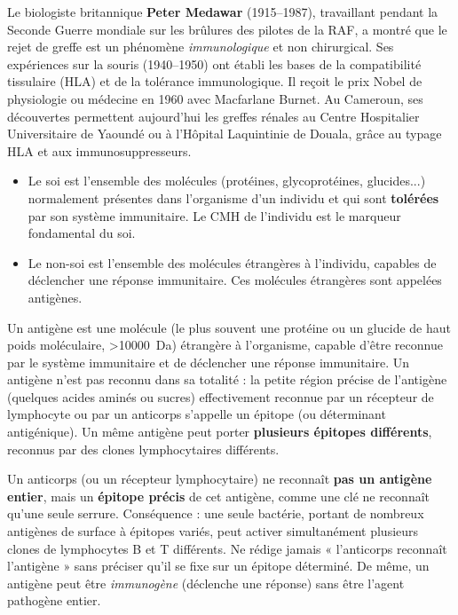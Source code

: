 \documentclass[11pt]{article}
\newcommand{\cle}[1]{{\popxbold\color{popdark}#1}}
\newcounter{popsec}
\newcounter{popsub}
\newcommand{\courssub}[1]{%
  \stepcounter{popsub}%
  \par\vspace{9pt}\noindent{\popxbold\fontsize{11.5}{13}\selectfont\color{popink}{\color{poporange}\thepopsec.\thepopsub}\hspace{6pt}#1}\par\nopagebreak\vspace{4pt}
}
\begin{document}
\begin{savaistu}
Le biologiste britannique \textbf{Peter Medawar} (1915--1987), travaillant pendant la Seconde Guerre mondiale sur les brûlures des pilotes de la RAF, a montré que le rejet de greffe est un phénomène \emph{immunologique} et non chirurgical. Ses expériences sur la souris (1940--1950) ont établi les bases de la compatibilité tissulaire (HLA) et de la tolérance immunologique. Il reçoit le prix Nobel de physiologie ou médecine en 1960 avec Macfarlane Burnet. Au Cameroun, ses découvertes permettent aujourd'hui les greffes rénales au Centre Hospitalier Universitaire de Yaoundé ou à l'Hôpital Laquintinie de Douala, grâce au typage HLA et aux immunosuppresseurs.
\end{savaistu}

\courssub{Le soi et le non-soi : définitions}

\begin{definition}
\begin{itemize}
\item Le \cle{soi} est l'ensemble des molécules (protéines, glycoprotéines, glucides...) normalement présentes dans l'organisme d'un individu et qui sont \textbf{tolérées} par son système immunitaire. Le CMH de l'individu est le marqueur fondamental du soi.
\item Le \cle{non-soi} est l'ensemble des molécules étrangères à l'individu, capables de déclencher une réponse immunitaire. Ces molécules étrangères sont appelées \cle{antigènes}.
\end{itemize}
\end{definition}

\begin{definition}
Un \cle{antigène} est une molécule (le plus souvent une protéine ou un glucide de haut poids moléculaire, \textgreater \SI{10000}{Da}) étrangère à l'organisme, capable d'être reconnue par le système immunitaire et de déclencher une réponse immunitaire. Un antigène n'est pas reconnu dans sa totalité : la petite région précise de l'antigène (quelques acides aminés ou sucres) effectivement reconnue par un récepteur de lymphocyte ou par un anticorps s'appelle un \cle{épitope} (ou déterminant antigénique). Un même antigène peut porter \textbf{plusieurs épitopes différents}, reconnus par des clones lymphocytaires différents.
\end{definition}

\begin{attention}
Un anticorps (ou un récepteur lymphocytaire) ne reconnaît \textbf{pas un antigène entier}, mais un \textbf{épitope précis} de cet antigène, comme une clé ne reconnaît qu'une seule serrure. Conséquence : une seule bactérie, portant de nombreux antigènes de surface à épitopes variés, peut activer simultanément plusieurs clones de lymphocytes B et T différents. Ne rédige jamais « l'anticorps reconnaît l'antigène » sans préciser qu'il se fixe sur un épitope déterminé. De même, un antigène peut être \emph{immunogène} (déclenche une réponse) sans être l'agent pathogène entier.
\end{attention}
\end{document}
